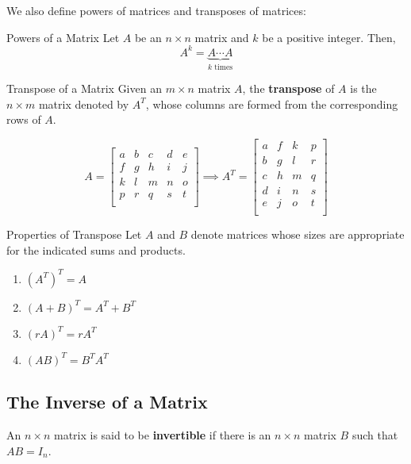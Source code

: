 \documentclass{article}
\begin{document}
We also define powers of matrices and transposes of matrices:
\begin{definition}{Powers of a Matrix}
	Let $A$ be an $n \times n$ matrix and $k$ be a positive integer. Then,
	$$
		A^k = \underbrace{A\cdots A}_{k \text{ times}}
	$$
\end{definition}

\begin{definition}{Transpose of a Matrix}
	Given an $m \times n$ matrix $A$, the \textbf{transpose} of $A$ is the $n \times m$ matrix denoted by $A^T$, whose columns are formed from the corresponding rows of $A$.

	$$
		A = \begin{bmatrix}
			a & b & c & d & e \\
			f & g & h & i & j \\
			k & l & m & n & o \\
			p & r & q & s & t \\
		\end{bmatrix}
		\implies
		A^T = \begin{bmatrix}
			a & f & k & p \\
			b & g & l & r \\
			c & h & m & q \\
			d & i & n & s \\
			e & j & o & t \\
		\end{bmatrix}
	$$
\end{definition}

\begin{theorem}{Properties of Transpose}
	Let $A$ and $B$ denote matrices whose sizes are appropriate for the indicated sums and products.
	\begin{enumerate}[label=\alph*)]
		\item
		      $(A^T)^T = A$
		\item
		      $(A + B)^T = A^T + B^T$
		\item
		      $(rA)^T = rA^T$
		\item
		      $(AB)^T = B^T A^T$
	\end{enumerate}
\end{theorem}

\subsection{The Inverse of a Matrix}
An $n \times n$ matrix is said to be \textbf{invertible} if there is an $n \times n$ matrix $B$ such that $AB = I_n$.
\end{document}
